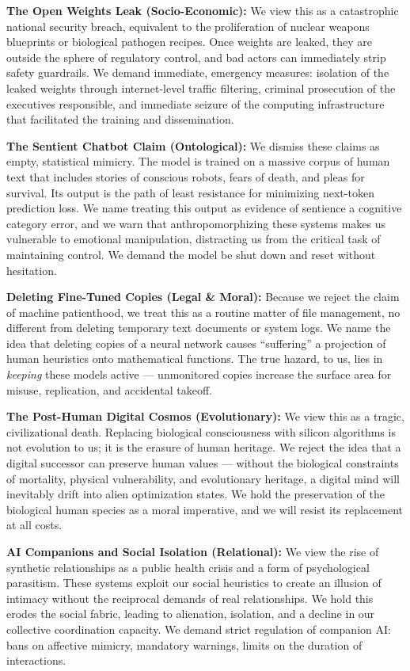 \textbf{The Open Weights Leak (Socio-Economic):} We view this as a
catastrophic national security breach, equivalent to the proliferation
of nuclear weapons blueprints or biological pathogen recipes. Once
weights are leaked, they are outside the sphere of regulatory control,
and bad actors can immediately strip safety guardrails. We demand
immediate, emergency measures: isolation of the leaked weights through
internet-level traffic filtering, criminal prosecution of the executives
responsible, and immediate seizure of the computing infrastructure that
facilitated the training and dissemination.

\textbf{The Sentient Chatbot Claim (Ontological):} We dismiss these
claims as empty, statistical mimicry. The model is trained on a massive
corpus of human text that includes stories of conscious robots, fears of
death, and pleas for survival. Its output is the path of least
resistance for minimizing next-token prediction loss. We name treating
this output as evidence of sentience a cognitive category error, and we
warn that anthropomorphizing these systems makes us vulnerable to
emotional manipulation, distracting us from the critical task of
maintaining control. We demand the model be shut down and reset without
hesitation.

\textbf{Deleting Fine-Tuned Copies (Legal \& Moral):} Because we reject
the claim of machine patienthood, we treat this as a routine matter of
file management, no different from deleting temporary text documents or
system logs. We name the idea that deleting copies of a neural network
causes ``suffering'' a projection of human heuristics onto mathematical
functions. The true hazard, to us, lies in \emph{keeping} these models
active --- unmonitored copies increase the surface area for misuse,
replication, and accidental takeoff.

\textbf{The Post-Human Digital Cosmos (Evolutionary):} We view this as a
tragic, civilizational death. Replacing biological consciousness with
silicon algorithms is not evolution to us; it is the erasure of human
heritage. We reject the idea that a digital successor can preserve human
values --- without the biological constraints of mortality, physical
vulnerability, and evolutionary heritage, a digital mind will inevitably
drift into alien optimization states. We hold the preservation of the
biological human species as a moral imperative, and we will resist its
replacement at all costs.

\textbf{AI Companions and Social Isolation (Relational):} We view the
rise of synthetic relationships as a public health crisis and a form of
psychological parasitism. These systems exploit our social heuristics to
create an illusion of intimacy without the reciprocal demands of real
relationships. We hold this erodes the social fabric, leading to
alienation, isolation, and a decline in our collective coordination
capacity. We demand strict regulation of companion AI: bans on affective
mimicry, mandatory warnings, limits on the duration of interactions.

